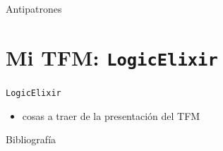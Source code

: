 \documentclass[14pt,aspectratio=169]{beamer}
\begin{document}
\begin{frame}{Antipatrones}

\end{frame}

\section{Mi TFM: \texttt{LogicElixir}}
\begin{frame}{\texttt{LogicElixir}}
  \begin{itemize}
    \item cosas a traer de la presentación del TFM
  \end{itemize}
\end{frame}

\begin{frame}{Bibliografía}
\end{frame}
\end{document}
